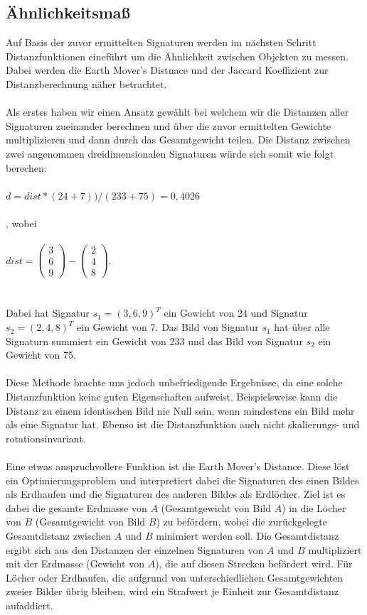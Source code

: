 \documentclass{scrartcl}
\begin{document}
\subsection{Ähnlichkeitsmaß}
Auf Basis der zuvor ermittelten Signaturen werden im nächsten Schritt Distanzfunktionen eineführt um die Ähnlichkeit zwischen Objekten zu messen. Dabei werden die Earth Mover's Distnace und der Jaccard Koeffizient zur Distanzberechnung näher betrachtet.
\\
\\
Als erstes haben wir einen Ansatz gewählt bei welchem wir die Distanzen aller Signaturen zueinander berechnen und über die zuvor ermittelten Gewichte multiplizieren und dann durch das Gesamtgewicht teilen. Die Distanz zwischen zwei angenommen dreidimensionalen Signaturen würde sich somit wie folgt berechen: 
\\
\\
$d = dist * (24 + 7))/ (233 + 75) = 0,4026$
\\
\\
, wobei 
\\
\\
$dist = \left( \begin{array}{c} 3 \\ 6 \\ 9 \end{array}\right) - \left( \begin{array}{c} 2 \\ 4 \\ 8 \end{array}\right)$.
\\ 
\\
\\
Dabei hat Signatur $s_{1} = (3,6,9)^{T}$ ein Gewicht von $24$ und Signatur $s_{2} = (2,4,8)^{T}$ ein Gewicht von $7$. Das Bild von Signatur $s_{1}$ hat über alle Signaturn summiert ein Gewicht von 233 und  das Bild von Signatur $s_{2}$ ein Gewicht von 75.
\\
\\
Diese Methode brachte uns jedoch unbefriedigende Ergebnisse, da eine solche Distanzfunktion keine guten Eigenschaften aufweist. Beispielsweise kann die Distanz zu einem identischen Bild nie Null sein, wenn mindestens ein Bild mehr als eine Signatur hat. Ebenso ist die Distanzfunktion auch nicht skalierungs- und rotationsinvariant. 
\\
\\ 
Eine etwas anspruchvollere Funktion ist die Earth Mover's Distance. Diese löst ein Optimierungsproblem und interpretiert dabei  die Signaturen des einen Bildes als Erdhaufen und die Signaturen des anderen Bildes als Erdlöcher. Ziel ist es dabei die gesamte Erdmasse von $A$ (Gesamtgewicht von Bild $A$) in die Löcher von $B$ (Gesamtgewicht von Bild $B$) zu befördern, wobei die zurückgelegte Gesamtdistanz zwischen $A$ und $B$ minimiert werden soll. Die Gesamtdistanz ergibt sich aus den Distanzen der einzelnen Signaturen von $A$ und $B$ multipliziert mit der Erdmasse (Gewicht von $A$), die auf diesen Strecken befördert wird. Für Löcher oder Erdhaufen, die aufgrund von unterschiedlichen Gesamtgewichten zweier Bilder übrig bleiben, wird ein Strafwert je Einheit zur Gesamtdistanz aufaddiert.
\end{document}
